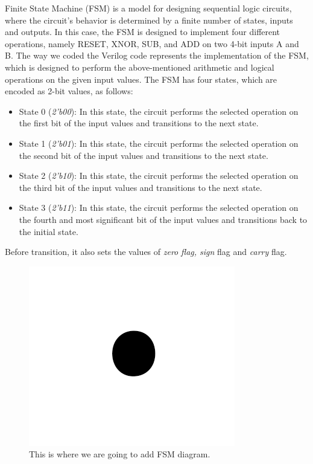Finite State Machine (FSM) is a model for designing sequential logic circuits,
where the circuit's behavior is determined by a finite number of states, inputs and outputs.
In this case, the FSM is designed to implement four different operations,
namely RESET, XNOR, SUB, and ADD on two 4-bit inputs A and B.
The way we coded the Verilog code represents the implementation of the FSM,
which is designed to perform the above-mentioned arithmetic and logical operations on the given input values.
The FSM has four states, which are encoded as 2-bit values, as follows:

\begin{itemize}
    \item State 0 (\textit{2'b00}): In this state, the circuit performs the selected operation on the first bit of the input values and transitions to the next state.
    \item State 1 (\textit{2'b01}): In this state, the circuit performs the selected operation on the second bit of the input values and transitions to the next state.
    \item State 2 (\textit{2'b10}): In this state, the circuit performs the selected operation on the third bit of the input values and transitions to the next state.
    \item State 3 (\textit{2'b11}): In this state, the circuit performs the selected operation on the fourth and most significant bit of the input values and transitions back to the initial state.
\end{itemize}

Before transition, it also sets the values of \textit{zero} \textit{flag, sign} flag and \textit{carry} flag.


\begin{figure}[htbp]
    \centerline{\includegraphics{figures/fig1}}
    \caption{This is where we are going to add FSM diagram.}
    \label{fig:FSM}
\end{figure}

